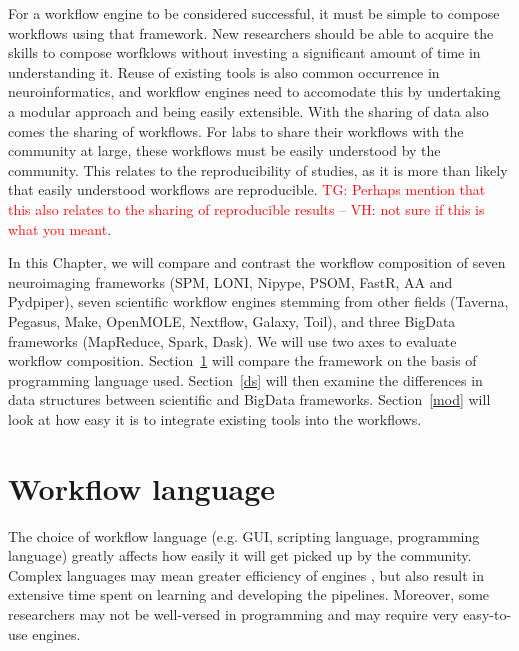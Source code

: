 \documentclass{report}
\newcommand{\tristan}[1]{\textcolor{red}{TG: #1}}
\begin{document}
        For a workflow engine to be considered successful, it must be simple to 
        compose workflows using that framework. New researchers should be able 
        to acquire the skills to compose worfklows without
        investing a significant amount of time in understanding it. Reuse of
        existing tools is also common occurrence in neuroinformatics, and 
        workflow engines need to accomodate this by undertaking a modular 
        approach and being easily extensible. With the sharing of data also 
        comes the sharing of workflows. For labs to share their workflows with
        the community at large, these workflows must be easily understood by the
        community. This relates to the reproducibility of studies, as it is 
        more than likely that easily understood workflows are reproducible. 
        \tristan{Perhaps mention that this also relates to the sharing
        of reproducible results -- VH: not sure if this is what you meant}.

        In this Chapter, we will compare and contrast the workflow composition 
        of seven neuroimaging frameworks (SPM, LONI, Nipype, PSOM, FastR, AA and
        Pydpiper), seven scientific workflow engines stemming from other fields
        (Taverna, Pegasus, Make, OpenMOLE, Nextflow, Galaxy, Toil), and three
        BigData frameworks (MapReduce, Spark, Dask). We will use two axes to
        evaluate workflow composition. Section~\ref{lang} will compare the 
        framework on the basis of programming language used. Section~\ref{ds}
        will then examine the differences in data structures between scientific
        and BigData frameworks. 
        Section~\ref{mod} will look at how easy it is to integrate existing 
        tools into the workflows.

        \section{Workflow language}\label{lang}
            The choice of workflow language (e.g. GUI, scripting language,
            programming language) greatly
            affects how easily it will get picked up by the community. Complex
            languages may mean greater efficiency of engines
            , but also result in extensive time spent on learning and developing
            the pipelines. Moreover, some researchers may not be well-versed in
            programming and may require very easy-to-use engines.
\end{document}
